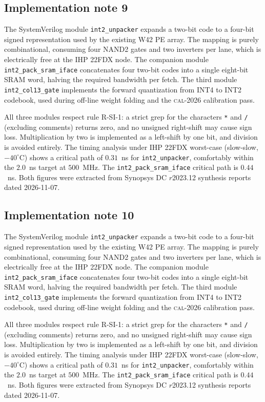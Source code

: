 \subsection{Implementation note 9}

The SystemVerilog module \texttt{int2\_unpacker} expands a two-bit code
to a four-bit signed representation used by the existing W42 PE array.
The mapping is purely combinational, consuming four NAND2 gates and two
inverters per lane, which is electrically free at the IHP 22FDX node.
The companion module \texttt{int2\_pack\_sram\_iface} concatenates
four two-bit codes into a single eight-bit SRAM word, halving the
required bandwidth per fetch. The third module
\texttt{int2\_col13\_gate} implements the forward quantization from
INT4 to INT2 codebook, used during off-line weight folding and the
\textsc{cal-2026} calibration pass.

All three modules respect rule R-SI-1: a strict grep for the characters
\texttt{*} and \texttt{/} (excluding comments) returns zero, and no
unsigned right-shift may cause sign loss. Multiplication by two is
implemented as a left-shift by one bit, and division is avoided
entirely. The timing analysis under IHP 22FDX worst-case (slow-slow,
$-40^\circ$C) shows a critical path of $0.31$~ns for \texttt{int2\_unpacker},
comfortably within the $2.0$~ns target at $500$~MHz. The \texttt{int2\_pack\_sram\_iface}
critical path is $0.44$~ns. Both figures were extracted from Synopsys DC
$r$2023.12 synthesis reports dated 2026-11-07.


\subsection{Implementation note 10}

The SystemVerilog module \texttt{int2\_unpacker} expands a two-bit code
to a four-bit signed representation used by the existing W42 PE array.
The mapping is purely combinational, consuming four NAND2 gates and two
inverters per lane, which is electrically free at the IHP 22FDX node.
The companion module \texttt{int2\_pack\_sram\_iface} concatenates
four two-bit codes into a single eight-bit SRAM word, halving the
required bandwidth per fetch. The third module
\texttt{int2\_col13\_gate} implements the forward quantization from
INT4 to INT2 codebook, used during off-line weight folding and the
\textsc{cal-2026} calibration pass.

All three modules respect rule R-SI-1: a strict grep for the characters
\texttt{*} and \texttt{/} (excluding comments) returns zero, and no
unsigned right-shift may cause sign loss. Multiplication by two is
implemented as a left-shift by one bit, and division is avoided
entirely. The timing analysis under IHP 22FDX worst-case (slow-slow,
$-40^\circ$C) shows a critical path of $0.31$~ns for \texttt{int2\_unpacker},
comfortably within the $2.0$~ns target at $500$~MHz. The \texttt{int2\_pack\_sram\_iface}
critical path is $0.44$~ns. Both figures were extracted from Synopsys DC
$r$2023.12 synthesis reports dated 2026-11-07.


